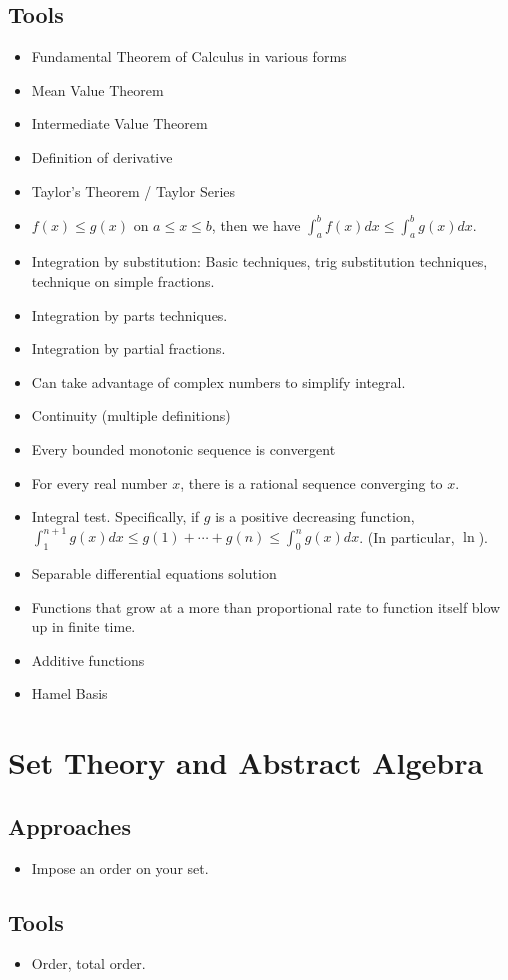 \documentclass[12pt]{amsart}
\begin{document}
\begin{multicols}{2}
\subsection{Tools}
\begin{itemize}
    \item Fundamental Theorem of Calculus in various forms
    \item Mean Value Theorem
    \item Intermediate Value Theorem
    \item Definition of derivative
    \item Taylor's Theorem / Taylor Series
    \item $f(x)\leq g(x)$ on $a \leq x \leq b$, then we have $\int_a^b f(x) dx \leq \int_a^b g(x) dx$.
    \item Integration by substitution: Basic techniques, trig substitution techniques, technique on simple fractions.
    \item Integration by parts techniques.
    \item Integration by partial fractions.
    \item Can take advantage of complex numbers to simplify integral.
    \item Continuity (multiple definitions)
    \item Every bounded monotonic sequence is convergent
    \item For every real number $x$, there is a rational sequence
        converging to $x$.
    \item Integral test. Specifically, if $g$ is a positive decreasing function, $\int_{1}^{n+1}g(x)dx \leq g(1) + \cdots + g(n) \leq \int_{0}^{n}g(x)dx$. (In particular, $\ln$).
    \item Separable differential equations solution
    \item Functions that grow at a more than proportional rate to function
        itself blow up in finite time.
    \item Additive functions
    \item Hamel Basis
\end{itemize}
\section{Set Theory and Abstract Algebra}
\subsection{Approaches}
\begin{itemize}
    \item Impose an order on your set.
\end{itemize}
\subsection{Tools}
\begin{itemize}
    \item Order, total order.
\end{itemize}
\end{multicols}
\end{document}
